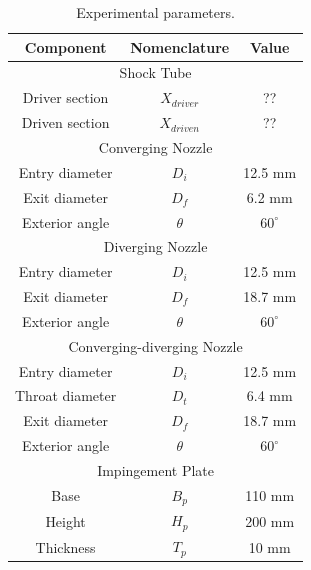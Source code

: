 \begin{table}[H]
\centering
\caption{Experimental parameters.}
\label{tab:experiment}
\begin{tabular}{@{}ccc@{}}
\toprule
\toprule
\textbf{Component} & \textbf{Nomenclature} & \textbf{Value} \\ \midrule
\multicolumn{3}{c}{Shock Tube}                                  \\ \midrule
Driver section     & $X_{driver}$          & ??                 \\
Driven section     & $X_{driven}$          & ??                 \\ \midrule
\multicolumn{3}{c}{Converging Nozzle}                           \\ \midrule
Entry diameter     & $D_i$                 & 12.5 mm            \\
Exit diameter      & $D_f$                 & 6.2 mm             \\
Exterior angle     & $\theta$              & $60^\circ$         \\ \midrule
\multicolumn{3}{c}{Diverging Nozzle}                            \\ \midrule
Entry diameter     & $D_i$                 & 12.5 mm            \\
Exit diameter      & $D_f$                 & 18.7 mm            \\
Exterior angle     & $\theta$              & $60^\circ$         \\ \midrule
\multicolumn{3}{c}{Converging-diverging Nozzle}                 \\ \midrule
Entry diameter     & $D_i$                 & 12.5 mm            \\
Throat diameter    & $D_t$                 & 6.4 mm             \\
Exit diameter      & $D_f$                 & 18.7 mm            \\
Exterior angle     & $\theta$              & $60^\circ$         \\ \midrule
\multicolumn{3}{c}{Impingement Plate}                           \\ \midrule
Base               & $B_p$                 & 110 mm             \\
Height             & $H_p$                 & 200 mm             \\
Thickness          & $T_p$                 & 10 mm              \\ \bottomrule
\bottomrule
\end{tabular}
\end{table}

